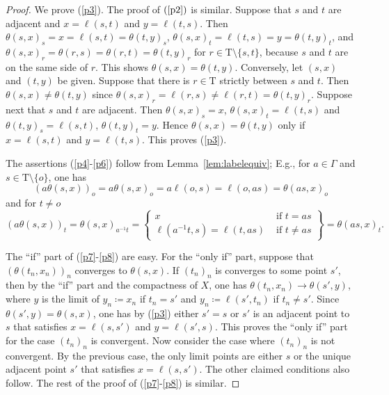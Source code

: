 \documentclass[12pt,nosumlimits,nonamelimits]{amsart}
\theoremstyle{remark}
\theoremstyle{definition}
\newcommand{\Ga}{\Gamma}
\newcommand{\Tree}{\mathrm{T}}
\begin{document}
\begin{proof}
We prove (\ref{p3}). The proof of $(\ref{p2})$ is similar. 
Suppose that $s$ and $t$ are adjacent 
and $x=\ell(s,t)$ and $y=\ell(t,s)$. 
Then $\theta(s,x)_s=x=\ell(s,t)=\theta(t,y)_s$, 
$\theta(s,x)_t=\ell(t,s)=y=\theta(t,y)_t$, and 
$\theta(s,x)_r = \theta(r,s)=\theta(r,t)=\theta(t,y)_r$ 
for $r\in\Tree\setminus\{s,t\}$, because $s$ and $t$ 
are on the same side of $r$. 
This shows $\theta(s,x)=\theta(t,y)$. 
Conversely, let $(s,x)$ and $(t,y)$ be given. 
Suppose that there is $r\in\Tree$ strictly between $s$ and $t$. 
Then $\theta(s,x)\neq\theta(t,y)$ since 
$\theta(s,x)_r = \ell(r,s) \neq \ell(r,t) = \theta(t,y)_r$. 
Suppose next that $s$ and $t$ are adjacent. 
Then $\theta(s,x)_s=x$, $\theta(s,x)_t=\ell(t,s)$ 
and $\theta(t,y)_s=\ell(s,t)$, $\theta(t,y)_t=y$. 
Hence $\theta(s,x)=\theta(t,y)$ only if $x=\ell(s,t)$ and $y=\ell(t,s)$.
This proves (\ref{p3}). 

The assertions (\ref{p4}-\ref{p6}) 
follow from Lemma~\ref{lem:labelequiv}; 
E.g., for $a\in\Ga$ and $s\in\Tree\setminus\{ o\}$, one has
\[
(a\theta(s,x))_o=a\theta(s,x)_o=a\ell(o,s)=\ell(o,as)=\theta(as,x)_o
\]
and for $t\neq o$ 
\[
(a\theta(s,x))_t = \theta(s,x)_{a^{-1}t}
 = \left\{\begin{array}{ll}
     x & \mbox{ if $t=as$} \\
     \ell(a^{-1}t,s) = \ell(t,as) & \mbox{ if $t\neq as$} 
   \end{array}\right\}
 =\theta(as,x)_t.
\]

The ``if'' part of (\ref{p7}-\ref{p8}) are easy. 
For the ``only if'' part, suppose that 
$(\theta(t_n,x_n))_n$ converges to $\theta(s,x)$. 
If $(t_n)_n$ is converges to some point $s'$, 
then by the ``if'' part and the compactness of $X$, 
one has $\theta(t_n,x_n) \to \theta(s',y)$, 
where $y$ is the limit of $y_n \coloneq x_n$ if $t_n=s'$ and 
$y_n \coloneq \ell(s',t_n)$ if $t_n\neq s'$. 
Since $\theta(s',y)=\theta(s,x)$, one has by (\ref{p3}) 
either $s'=s$ or $s'$ is an adjacent point to $s$ 
that satisfies $x=\ell(s,s')$ and $y=\ell(s',s)$. 
This proves the ``only if'' part for the case $(t_n)_n$ is convergent. 
Now consider the case where $(t_n)_n$ is not convergent. 
By the previous case, the only limit points are 
either $s$ or the unique adjacent point $s'$ 
that satisfies $x=\ell(s,s')$. 
The other claimed conditions also follow. 
The rest of the proof of (\ref{p7}-\ref{p8}) is similar. 


\end{proof}
\end{document}
